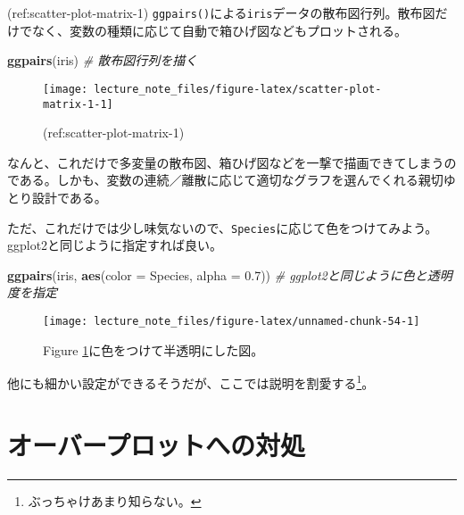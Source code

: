\documentclass[]{book}
\newenvironment{Shaded}{\begin{snugshade}}{\end{snugshade}}
\newcommand{\KeywordTok}[1]{\textcolor[rgb]{0.13,0.29,0.53}{\textbf{#1}}}
\newcommand{\DataTypeTok}[1]{\textcolor[rgb]{0.13,0.29,0.53}{#1}}
\newcommand{\FloatTok}[1]{\textcolor[rgb]{0.00,0.00,0.81}{#1}}
\newcommand{\CommentTok}[1]{\textcolor[rgb]{0.56,0.35,0.01}{\textit{#1}}}
\newcommand{\NormalTok}[1]{#1}
\let\rmarkdownfootnote\footnote%
\def\footnote{\protect\rmarkdownfootnote}
\begin{document}
(ref:scatter-plot-matrix-1)
\texttt{ggpairs()}による\texttt{iris}データの散布図行列。散布図だけでなく、変数の種類に応じて自動で箱ひげ図などもプロットされる。

\begin{Shaded}
\begin{Highlighting}[]
\KeywordTok{ggpairs}\NormalTok{(iris) }\CommentTok{# 散布図行列を描く}
\end{Highlighting}
\end{Shaded}

\begin{figure}

{\centering \texttt{[image: lecture\_note\_files/figure-latex/scatter-plot-matrix-1-1]} 

}

\caption{(ref:scatter-plot-matrix-1)}\label{fig:scatter-plot-matrix-1}
\end{figure}

なんと、これだけで多変量の散布図、箱ひげ図などを一撃で描画できてしまうのである。しかも、変数の連続／離散に応じて適切なグラフを選んでくれる親切ゆとり設計である。

ただ、これだけでは少し味気ないので、\texttt{Species}に応じて色をつけてみよう。ggplot2と同じように指定すれば良い。




\begin{Shaded}
\begin{Highlighting}[]
\KeywordTok{ggpairs}\NormalTok{(iris, }\KeywordTok{aes}\NormalTok{(}\DataTypeTok{color =}\NormalTok{ Species, }\DataTypeTok{alpha =} \FloatTok{0.7}\NormalTok{)) }\CommentTok{# ggplot2と同じように色と透明度を指定}
\end{Highlighting}
\end{Shaded}

\begin{figure}

{\centering \texttt{[image: lecture\_note\_files/figure-latex/unnamed-chunk-54-1]} 

}

\caption{Figure
\ref{fig:scatter-plot-matrix-1}に色をつけて半透明にした図。}\label{fig:unnamed-chunk-54}
\end{figure}

他にも細かい設定ができるそうだが、ここでは説明を割愛する\footnote{ぶっちゃけあまり知らない。}。

\section{オーバープロットへの対処}
\end{document}
